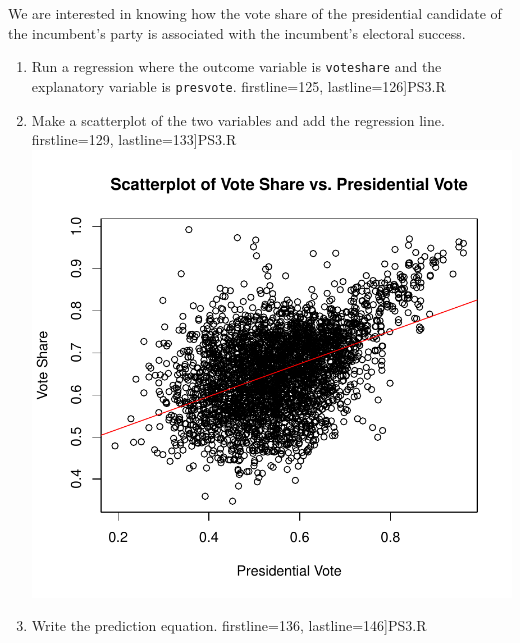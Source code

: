 \documentclass[12pt,letterpaper]{article}
\begin{document}
\noindent We are interested in knowing how the vote share of the presidential candidate of the incumbent's party is associated with the incumbent's electoral success.
	\vspace{.25cm}
	\begin{enumerate}
		\item Run a regression where the outcome variable is \texttt{voteshare} and the explanatory variable is \texttt{presvote}. \vspace{0.2cm}
		 firstline=125, lastline=126]{PS3.R} 
		\item Make a scatterplot of the two variables and add the regression line. \vspace{0.2cm}
		 firstline=129, lastline=133]{PS3.R} 
		\noindent\includegraphics[width=.75\textwidth]{scatterplot3.pdf}
		\label{fig:scatterplot_3}
		\item Write the prediction equation.
		 firstline=136, lastline=146]{PS3.R} 
	\end{enumerate}

\newpage	
\end{document}

